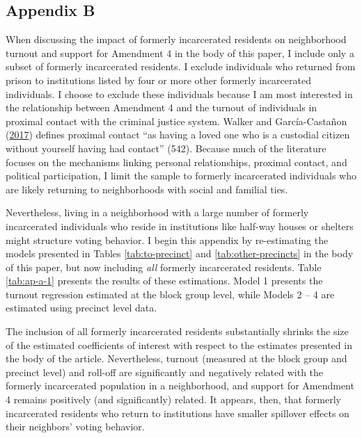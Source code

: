 \documentclass[
  12pt,
]{article}
\begin{document}
\newpage

\hypertarget{appendix-b}{%
\subsection*{Appendix B}\label{appendix-b}}

When discussing the impact of formerly incarcerated residents on neighborhood turnout and support for Amendment 4 in the body of this paper, I include only a subset of formerly incarcerated residents. I exclude individuals who returned from prison to institutions listed by four or more other formerly incarcerated individuals. I choose to exclude these individuals because I am most interested in the relationship between Amendment 4 and the turnout of individuals in proximal contact with the criminal justice system. Walker and García-Castañon (\protect\hyperlink{ref-Walker2017}{2017}) defines proximal contact ``as having a loved one who is a custodial citizen without yourself having had contact'' (542). Because much of the literature focuses on the mechanisms linking personal relationships, proximal contact, and political participation, I limit the sample to formerly incarcerated individuals who are likely returning to neighborhoods with social and familial ties.

Nevertheless, living in a neighborhood with a large number of formerly incarcerated individuals who reside in institutions like half-way houses or shelters might structure voting behavior. I begin this appendix by re-estimating the models presented in Tables \ref{tab:to-precinct} and \ref{tab:other-precincts} in the body of this paper, but now including \emph{all} formerly incarcerated residents. Table \ref{tab:ap-a-1} presents the results of these estimations. Model 1 presents the turnout regression estimated at the block group level, while Models 2 -- 4 are estimated using precinct level data.

\begin{singlespace}


\end{singlespace}

The inclusion of all formerly incarcerated residents substantially shrinks the size of the estimated coefficients of interest with respect to the estimates presented in the body of the article. Nevertheless, turnout (measured at the block group and precinct level) and roll-off are significantly and negatively related with the formerly incarcerated population in a neighborhood, and support for Amendment 4 remains positively (and significantly) related. It appears, then, that formerly incarcerated residents who return to institutions have smaller spillover effects on their neighbors' voting behavior.
\end{document}
